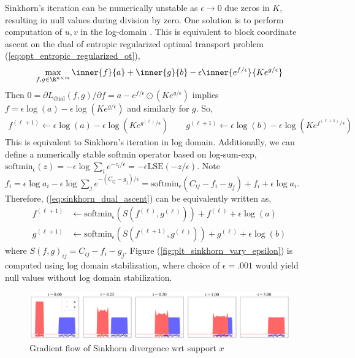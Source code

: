 \documentclass[11pt]{article}
\begin{document}
Sinkhorn's iteration can be numerically unstable as $\epsilon\to 0$ due zeros in $K$, resulting in null values during division by zero. One solution is to perform computation of $u,v$ in the log-domain \cite{chizatScalingAlgorithmsUnbalanced2017, schmitzerStabilizedSparseScaling2019}. This is equivalent to block coordinate ascent on the dual of entropic regularized optimal transport problem (\ref{eq:opt_entropic_regularized_ot}),
\begin{align}
    \max_{f,g\in\R^{n\times m}} \inner{f}{a} + \inner{g}{b} - \epsilon\inner{e^{f/\epsilon}}{Ke^{g/\epsilon}}
\end{align}
Then $0 = \partial L_{\text{dual}}(f,g)/\partial f = a - e^{f/\epsilon} \odot (Ke^{g/\epsilon})$ implies $f = \epsilon \log(a) - \epsilon \log(Ke^{g/\epsilon})$ and similarly for $g$. So,
\begin{align}
    f^{(\ell+1)}
        \leftarrow \epsilon \log(a) - \epsilon\log(Ke^{g^{(\ell)}/\epsilon})
    \quad\quad
    g^{(\ell+1)}
        \leftarrow \epsilon \log(b) - \epsilon\log(Ke^{f^{(\ell+1)}/\epsilon})
    \label{eq:sinkhorn_dual_ascent}
\end{align}
This is equivalent to Sinkhorn's iteration in log domain. Additionally, we can define a numerically stable softmin operator based on log-sum-exp, $\text{softmin}_{\epsilon}(z) = - \epsilon \log \sum_{i} e^{-z_i/\epsilon} = -\epsilon \text{LSE}(-z/\epsilon)$. Note $f_i = \epsilon \log a_i - \epsilon \log \sum_j e^{-(C_{ij}-g_j)/\epsilon} =\text{softmin}_{\epsilon}(C_{ij}-f_i-g_j) + f_i +  \epsilon \log a_i$. Therefore, (\ref{eq:sinkhorn_dual_ascent}) can be equivalently written as,
\begin{align}
    f^{(\ell+1)}
        &\leftarrow \text{softmin}_{\epsilon} (S(f^{(\ell)}, g^{(\ell)})) + f^{(\ell)} + \epsilon \log(a) \\ 
    g^{(\ell+1)}
        &\leftarrow \text{softmin}_{\epsilon} (S(f^{(\ell+1)}, g^{(\ell)})) + g^{(\ell)} + \epsilon \log(b)
    \label{eq:sinkhorn_dual_ascent2}
\end{align}
where $S(f,g)_{ij} = C_{ij}-f_i-g_j$. Figure (\ref{fig:plt_sinkhorn_vary_epsilon}) is computed using log domain stabilization, where choice of $\epsilon=.001$ would yield null values without log domain stabilization.
 
\begin{center} 
\begin{figure}[h!]
    \includegraphics[width=\textwidth]{assets/plt_gradientflow1d} 
    \caption{Gradient flow of Sinkhorn divergence wrt support $x$}
    \label{fig:plt_gradientflow1d}
\end{figure}
\end{center} 
\end{document}
